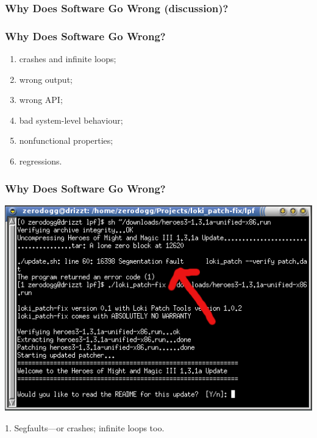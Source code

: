\documentclass{beamer}
\newenvironment{changemargin}[1]{%
  \begin{list}{}{%
    \setlength{\topsep}{0pt}%
    \setlength{\leftmargin}{#1}%
    \setlength{\rightmargin}{1em}
    \setlength{\listparindent}{\parindent}%
    \setlength{\itemindent}{\parindent}%
    \setlength{\parsep}{\parskip}%
  }%
  \item[]}{\end{list}}
\begin{document}
\begin{frame}

  \frametitle{Why Does Software Go Wrong (discussion)?}


\end{frame}

\begin{frame}

  \frametitle{Why Does Software Go Wrong?}

  \begin{enumerate}
  \item crashes and infinite loops;
  \item wrong output;
  \item wrong API;
  \item bad system-level behaviour;
  \item nonfunctional properties;
  \item regressions.
  \end{enumerate}

\end{frame}


\begin{frame}

  \frametitle{Why Does Software Go Wrong?}

\begin{center}
  \includegraphics[height=0.6\textheight]{L01/lpf.png}
\end{center}

\begin{changemargin}{2em}
  1. Segfaults---or crashes; infinite loops too.
\end{changemargin}

\end{frame}
\end{document}
